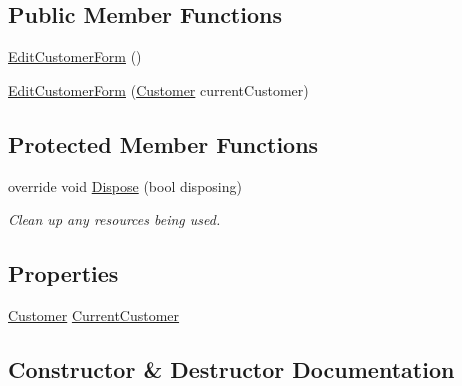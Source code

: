 \subsection*{Public Member Functions}
\begin{DoxyCompactItemize}
\item 
\hyperlink{class_health___assignment_1_1_edit_customer_form_ad62bc2ff7486bae2430bf4f6fdb0ad42}{Edit\+Customer\+Form} ()
\item 
\hyperlink{class_health___assignment_1_1_edit_customer_form_a0d113fb16c67d9485cae017ecf3a26f0}{Edit\+Customer\+Form} (\hyperlink{class_health___assignment_1_1_customer}{Customer} current\+Customer)
\end{DoxyCompactItemize}
\subsection*{Protected Member Functions}
\begin{DoxyCompactItemize}
\item 
override void \hyperlink{class_health___assignment_1_1_edit_customer_form_abeb310769b9ae11931b60f6d11cb8400}{Dispose} (bool disposing)
\begin{DoxyCompactList}\small\item\em Clean up any resources being used. \end{DoxyCompactList}\end{DoxyCompactItemize}
\subsection*{Properties}
\begin{DoxyCompactItemize}
\item 
\hyperlink{class_health___assignment_1_1_customer}{Customer} \hyperlink{class_health___assignment_1_1_edit_customer_form_a19eda06b43bc01c10061b3406b9b7e82}{Current\+Customer}
\end{DoxyCompactItemize}


\subsection{Constructor \& Destructor Documentation}
\mbox{\label{class_health___assignment_1_1_edit_customer_form_ad62bc2ff7486bae2430bf4f6fdb0ad42}} 
